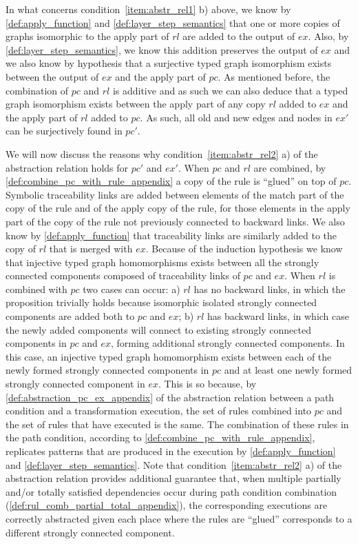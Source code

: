 \begin{pf}
\begin{itemize}
In what concerns condition~\ref{item:abstr_rel1} b) above, we know by \cref{def:apply_function} and \cref{def:layer_step_semantics} that one or more copies of graphs isomorphic to the apply part of $rl$ are added to the output of $ex$. Also, by \cref{def:layer_step_semantics}, we know this addition preserves the output of $ex$ and we also know by hypothesis that a surjective typed graph isomorphism exists between the output of $ex$ and the apply part of $pc$. As mentioned before, the combination of $pc$ and $rl$ is additive and as such we can also deduce that a typed graph isomorphism exists between the apply part of any copy $rl$ added to $ex$ and the apply part of $rl$ added to $pc$. As such, all old and new edges and nodes in $ex'$ can be surjectively found in $pc'$.\vspace{.3cm}

We will now discuss the reasons why condition~\ref{item:abstr_rel2} a) of the abstraction relation holds for $pc'$ and $ex'$. When $pc$ and $rl$ are combined, by \cref{def:combine_pc_with_rule_appendix} a copy of the rule is ``glued'' on top of $pc$. Symbolic traceability links are added between elements of the match part of the copy of the rule and of the apply copy of the rule, for those elements in the apply part of the copy of the rule not previously connected to backward links. We also know by \cref{def:apply_function} that traceability links are similarly added to the copy of $rl$ that is merged with $ex$. Because of the induction hypothesis we know that injective typed graph homomorphisms exists between all the strongly connected components composed of traceability links of $pc$ and $ex$. When $rl$ is combined with $pc$ two cases can occur: a) $rl$ has no backward links, in which the proposition trivially holds because isomorphic isolated strongly connected components are added both to $pc$ and $ex$; b) $rl$ has backward links, in which case the newly added components will connect to existing strongly connected components in $pc$ and $ex$, forming additional strongly connected components. In this case, an injective typed graph homomorphism exists between each of the newly formed strongly connected components in $pc$ and at least one newly formed strongly connected component in $ex$. This is so because, by \cref{def:abstraction_pc_ex_appendix} of the abstraction relation between a path condition and a transformation execution, the set of rules combined into $pc$ and the set of rules that have executed is the same. The combination of these rules in the path condition, according to \cref{def:combine_pc_with_rule_appendix}, replicates patterns that are produced in the execution by \cref{def:apply_function} and \cref{def:layer_step_semantics}. Note that condition~\ref{item:abstr_rel2} a) of the abstraction relation provides additional guarantee that, when multiple partially and/or totally satisfied dependencies occur during path condition combination (\cref{def:rul_comb_partial_total_appendix}), the corresponding executions are correctly abstracted given each place where the rules are ``glued'' corresponds to a different strongly connected component.\vspace{.3cm}
 

\end{itemize}
\end{pf}
